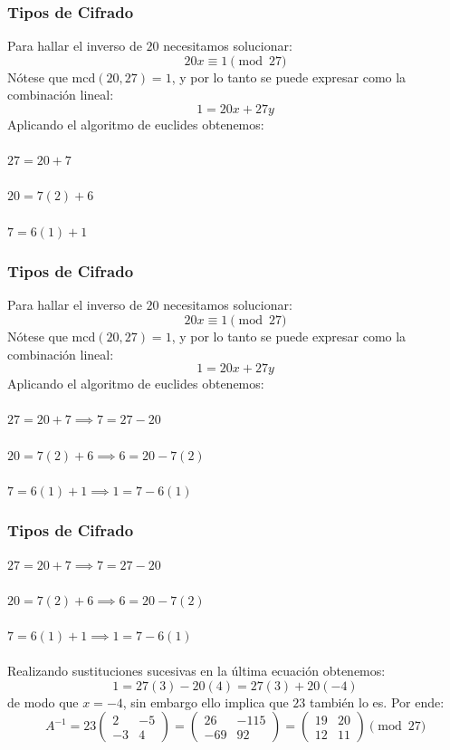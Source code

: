\documentclass[spanish, mexico]{beamer}
\begin{document}
	\begin{frame}
		\frametitle{Tipos de Cifrado}
		 \begin{solution}
		    Para hallar el inverso de $20$ necesitamos solucionar:
		    $$20x \equiv 1 \pmod{27}$$
		    Nótese que mcd$(20, 27) = 1$, y por lo tanto se puede expresar como la combinación lineal:
		    $$1 = 20x + 27y$$
		    Aplicando el algoritmo de euclides obtenemos:\\~\\
		    $27 = 20 + 7$\\~\\
		    $20 = 7(2) + 6$\\~\\
		    $7  = 6(1) + 1$
		 \end{solution}
	\end{frame}
	
	\begin{frame}
		\frametitle{Tipos de Cifrado}
		 \begin{solution}
		    Para hallar el inverso de $20$ necesitamos solucionar:
		    $$20x \equiv 1 \pmod{27}$$
		    Nótese que mcd$(20, 27) = 1$, y por lo tanto se puede expresar como la combinación lineal:
		    $$1 = 20x + 27y$$
		    Aplicando el algoritmo de euclides obtenemos:\\~\\
		    $27 = 20 + 7 \implies 7 = 27 - 20$\\~\\
		    $20 = 7(2) + 6 \implies 6 = 20 - 7(2)$\\~\\
		    $7  = 6(1) + 1 \implies 1 = 7 - 6(1)$
		 \end{solution}
	\end{frame}
	
	\begin{frame}
		\frametitle{Tipos de Cifrado}
		 \begin{solution}
		    $27 = 20 + 7 \implies 7 = 27 - 20$\\~\\
		    $20 = 7(2) + 6 \implies 6 = 20 - 7(2)$\\~\\
		    $7  = 6(1) + 1 \implies 1 = 7 - 6(1)$\\~\\
		    Realizando sustituciones sucesivas en la última ecuación obtenemos:
		    $$1 = 27(3) - 20(4) = 27(3) + 20(-4)$$
		    de modo que $x=-4$, sin embargo ello implica que $23$ también lo es. Por ende:
		    $$A^{-1} = 23 \begin{pmatrix} 2 & -5\\ -3 & 4\end{pmatrix} = \begin{pmatrix} 26 & -115\\ -69 & 92\end{pmatrix} = \begin{pmatrix} 19 & 20\\ 12 & 11\end{pmatrix} \pmod{27}$$
		 \end{solution}
	\end{frame}
	
\end{document}
